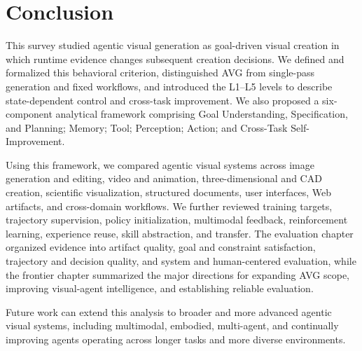 \section{Conclusion}
\label{sec:conclusion}

This survey studied agentic visual generation as goal-driven visual creation in which runtime evidence changes subsequent creation decisions. We defined and formalized this behavioral criterion, distinguished AVG from single-pass generation and fixed workflows, and introduced the L1--L5 levels to describe state-dependent control and cross-task improvement. We also proposed a six-component analytical framework comprising Goal Understanding, Specification, and Planning; Memory; Tool; Perception; Action; and Cross-Task Self-Improvement.

Using this framework, we compared agentic visual systems across image generation and editing, video and animation, three-dimensional and CAD creation, scientific visualization, structured documents, user interfaces, Web artifacts, and cross-domain workflows. We further reviewed training targets, trajectory supervision, policy initialization, multimodal feedback, reinforcement learning, experience reuse, skill abstraction, and transfer. The evaluation chapter organized evidence into artifact quality, goal and constraint satisfaction, trajectory and decision quality, and system and human-centered evaluation, while the frontier chapter summarized the major directions for expanding AVG scope, improving visual-agent intelligence, and establishing reliable evaluation.

Future work can extend this analysis to broader and more advanced agentic visual systems, including multimodal, embodied, multi-agent, and continually improving agents operating across longer tasks and more diverse environments.
